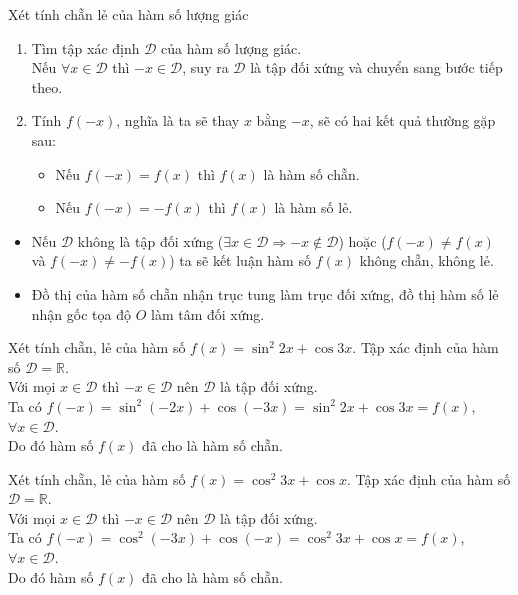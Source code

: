 \begin{dang}{Xét tính chẵn lẻ của hàm số lượng giác}
	\begin{enumerate}[\bf Bước 1.]
		\item Tìm tập xác định $\mathscr{D}$ của hàm số lượng giác.\\
		Nếu $\forall x\in\mathscr{D}$ thì $-x\in\mathscr{D}$, suy ra $\mathscr{D}$ là tập đối xứng và chuyển sang bước tiếp theo.
		\item Tính $f(-x)$, nghĩa là ta sẽ thay $x$ bằng $-x$, sẽ có hai kết quả thường gặp sau:
		\begin{itemize}
			\item Nếu $f(-x)=f(x)$ thì $f(x)$ là hàm số chẵn.
			\item Nếu $f(-x)=-f(x)$ thì $f(x)$ là hàm số lẻ.
		\end{itemize}
	\end{enumerate}
	\begin{note}
		\begin{itemize}
			\item Nếu $\mathscr{D}$ không là tập đối xứng ($\exists x\in\mathscr{D}\Rightarrow -x\not\in\mathscr{D}$) hoặc ($f(-x)\ne f(x)$ và $f(-x)\ne -f(x)$) ta sẽ kết luận hàm số $f(x)$ không chẵn, không lẻ.
			\item Đồ thị của hàm số chẵn nhận trục tung làm trục đối xứng, đồ thị hàm số lẻ nhận gốc tọa độ $O$ làm tâm đối xứng.
		\end{itemize}
	\end{note}
\end{dang}
\setcounter{bt}{0}
\begin{bt}%
	Xét tính chẵn, lẻ của hàm số $f(x)=\sin^2 2x+\cos 3x$.
	\loigiai
	{
		Tập xác định của hàm số $\mathscr{D}=\mathbb{R}$.\\
		Với mọi $x\in\mathscr{D}$ thì $-x\in\mathscr{D}$ nên $\mathscr{D}$ là tập đối xứng.\\
		Ta có $f(-x)=\sin^2(-2x)+\cos(-3x)=\sin^2 2x+\cos 3x=f(x)$, $\forall x\in\mathscr{D}$.\\
		Do đó hàm số $f(x)$ đã cho là hàm số chẵn.
	}
\end{bt}
\begin{bt}%
	Xét tính chẵn, lẻ của hàm số $f(x)=\cos^2 3x+\cos x$.
	\loigiai
	{
		Tập xác định của hàm số $\mathscr{D}=\mathbb{R}$.\\
		Với mọi $x\in\mathscr{D}$ thì $-x\in\mathscr{D}$ nên $\mathscr{D}$ là tập đối xứng.\\
		Ta có $f(-x)=\cos^2(-3x)+\cos(-x)=\cos^2 3x+\cos x=f(x)$, $\forall x\in\mathscr{D}$.\\
		Do đó hàm số $f(x)$ đã cho là hàm số chẵn.
	}
\end{bt}
